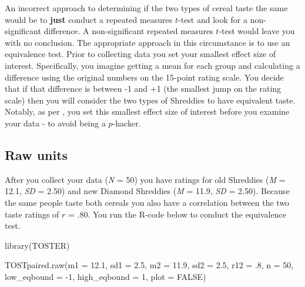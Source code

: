 \documentclass[
]{krantz}
\makeatletter
\newenvironment{Shaded}{\begin{snugshade}}{\end{snugshade}}
\newcommand{\AttributeTok}[1]{\textcolor[rgb]{0.61,0.61,0.61}{#1}}
\newcommand{\ConstantTok}[1]{\textcolor[rgb]{0,0,0}{#1}}
\newcommand{\DecValTok}[1]{\textcolor[rgb]{0.06,0.06,0.06}{#1}}
\newcommand{\FloatTok}[1]{\textcolor[rgb]{0.06,0.06,0.06}{#1}}
\newcommand{\FunctionTok}[1]{\textcolor[rgb]{0,0,0}{#1}}
\newcommand{\NormalTok}[1]{#1}
\newcommand{\SpecialCharTok}[1]{\textcolor[rgb]{0,0,0}{#1}}
\newenvironment{kframe}{%
\medskip{}
\setlength{\fboxsep}{.8em}
 \def\at@end@of@kframe{}%
 \ifinner\ifhmode%
  \def\at@end@of@kframe{\end{minipage}}%
  \begin{minipage}{\columnwidth}%
 \fi\fi%
 \def\FrameCommand##1{\hskip\@totalleftmargin \hskip-\fboxsep
 \colorbox{shadecolor}{##1}\hskip-\fboxsep
     \hskip-\linewidth \hskip-\@totalleftmargin \hskip\columnwidth}%
 \MakeFramed {\advance\hsize-\width
   \@totalleftmargin\z@ \linewidth\hsize
   \@setminipage}}%
 {\par\unskip\endMakeFramed%
 \at@end@of@kframe}
\renewenvironment{Shaded}{\begin{kframe}}{\end{kframe}}
\makeatother
\begin{document}
An incorrect approach to determining if the two types of cereal taste the same would be to \textbf{just} conduct a repeated measures \(t\)-test and look for a non-significant difference. A non-significant repeated measures \(t\)-test would leave you with no conclusion. The appropriate approach in this circumstance is to use an equivalence test. Prior to collecting data you set your smallest effect size of interest. Specifically, you imagine getting a mean for each group and calculating a difference using the original numbers on the 15-point rating scale. You decide that if that difference is between -1 and +1 (the smallest jump on the rating scale) then you will consider the two types of Shreddies to have equivalent taste. Notably, as per \citep{lakens2018equivalence}, you set this smallest effect size of interest before you examine your data - to avoid being a \(p\)-hacker.

\hypertarget{raw-units}{%
\subsection{Raw units}\label{raw-units}}

After you collect your data (\emph{N} = 50) you have ratings for old Shreddies (\emph{M} = 12.1, \emph{SD} = 2.50) and new Diamond Shreddies (\emph{M} = 11.9, \emph{SD} = 2.50). Because the same people taste both cereals you also have a correlation between the two taste ratings of \(r\) = .80. You run the R-code below to conduct the equivalence test.

\begin{Shaded}
\begin{Highlighting}[]
\FunctionTok{library}\NormalTok{(TOSTER)}

\FunctionTok{TOSTpaired.raw}\NormalTok{(}\AttributeTok{m1 =} \FloatTok{12.1}\NormalTok{,}
        \AttributeTok{sd1 =} \FloatTok{2.5}\NormalTok{,}
        \AttributeTok{m2 =} \FloatTok{11.9}\NormalTok{,}
        \AttributeTok{sd2 =} \FloatTok{2.5}\NormalTok{,}
        \AttributeTok{r12 =}\NormalTok{ .}\DecValTok{8}\NormalTok{,}
        \AttributeTok{n =} \DecValTok{50}\NormalTok{,}
        \AttributeTok{low\_eqbound =} \SpecialCharTok{{-}}\DecValTok{1}\NormalTok{,}
        \AttributeTok{high\_eqbound =} \DecValTok{1}\NormalTok{,}
        \AttributeTok{plot =} \ConstantTok{FALSE}\NormalTok{)}
\end{Highlighting}
\end{Shaded}
\end{document}
